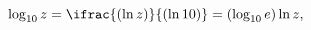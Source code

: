\[\mathop{\mathrm{log}_{10}\/}\nolimits z=\ifrac{(\mathop{\ln\/}\nolimits z)}{(%
\mathop{\ln\/}\nolimits 10)}=(\mathop{\mathrm{log}_{10}\/}\nolimits e)\mathop{%
\ln\/}\nolimits z,\]